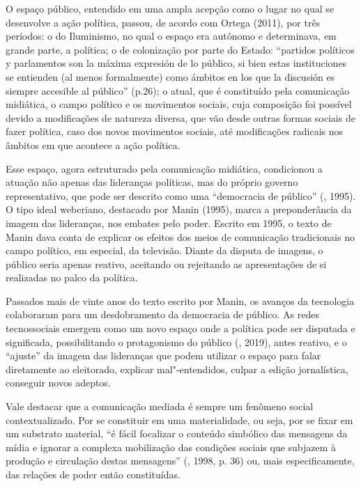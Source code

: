 O espaço público, entendido em uma ampla acepção como o lugar no qual se
desenvolve a ação política, passou, de acordo com Ortega (2011), por
três períodos: o do Iluminismo, no qual o espaço era autônomo e
determinava, em grande parte, a política; o de colonização por parte do
Estado: ``partidos políticos y parlamentos son la máxima expresión de lo
público, si bien estas instituciones se entienden (al menos formalmente)
como ámbitos en los que la discusión es siempre accesible al público''
(p.26); o atual, que é constituído pela comunicação midiática, o campo
político e os movimentos sociais, cuja composição foi possível devido a
modificações de natureza diversa, que vão desde outras formas sociais de
fazer política, caso dos novos movimentos sociais, até modificações
radicais nos âmbitos em que acontece a ação política.

Esse espaço, agora estruturado pela comunicação midiática, condicionou a
atuação não apenas das lideranças políticas, mas do próprio governo
representativo, que pode ser descrito como uma ``democracia de público''
(, 1995). O tipo ideal weberiano, destacado por Manin (1995), marca
a preponderância da imagem das lideranças, nos embates pelo poder.
Escrito em 1995, o texto de Manin dava conta de explicar os efeitos dos
meios de comunicação tradicionais no campo político, em especial, da
televisão. Diante da disputa de imagens, o público seria apenas reativo,
aceitando ou rejeitando as apresentações de si realizadas no palco da
política.

Passados mais de vinte anos do texto escrito por Manin, os avanços da
tecnologia colaboraram para um desdobramento da democracia de público.
As redes tecnossociais emergem como um novo espaço onde a política pode
ser disputada e significada, possibilitando o protagonismo do público
(, 2019), antes reativo, e o ``ajuste'' da imagem das lideranças
que podem utilizar o espaço para falar diretamente ao eleitorado,
explicar mal"-entendidos, culpar a edição jornalística, conseguir novos
adeptos.

Vale destacar que a comunicação mediada é sempre um fenômeno social
contextualizado. Por se constituir em uma materialidade, ou seja, por se
fixar em um substrato material, ``é fácil focalizar o conteúdo simbólico
das mensagens da mídia e ignorar a complexa mobilização das condições
sociais que subjazem à produção e circulação destas mensagens''
(, 1998, p. 36) ou, mais especificamente, das relações de poder
então constituídas.

